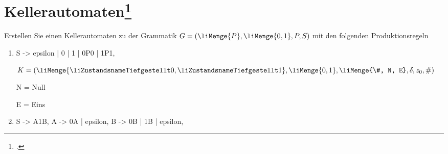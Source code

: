 \documentclass{lehramt-informatik-aufgabe}
\begin{document}
\let\m=\liMenge
\let\z=\liZustandsnameTiefgestellt
\let\u=\liKellerUebergang


\section{Kellerautomaten\footcite[Seite 27]{theo:fs:2}}

Erstellen Sie einen Kellerautomaten zu der Grammatik $G = (\m{P} , \m{0,
1}, P, S)$ mit den folgenden Produktionsregeln

\begin{enumerate}

%

\item

\begin{liProduktionsRegeln}
S -> epsilon | 0 | 1 | 0P0 | 1P1,
\end{liProduktionsRegeln}

\begin{liAntwort}
$K = (\m{\z0, \z1}, \m{0, 1}, \m{\#, N, E}, \delta, z_0, \#)$

N = Null

E = Eins

\begin{center}
\end{center}

\end{liAntwort}

%

\item

\begin{liProduktionsRegeln}
S -> A1B,
A -> 0A | epsilon,
B -> 0B | 1B | epsilon,
\end{liProduktionsRegeln}
\end{enumerate}
\end{document}

